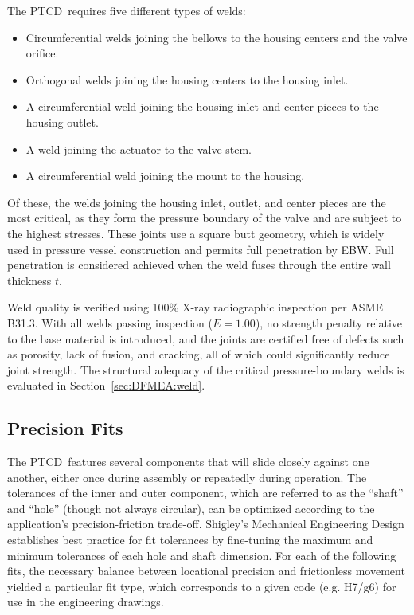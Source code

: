 \documentclass[12pt, letterpaper]{report}%
\newcounter{mycounter}           %
\newcounter{sub}[mycounter]      %
\newcommand{\device}{PTCD}
\begin{document}
		The \device\ requires five different types of welds:

		\begin{itemize}
			\item Circumferential welds joining the bellows to the housing centers and the 
				valve orifice.
			\item Orthogonal welds joining the housing centers to the housing inlet.
			\item A circumferential weld joining the housing inlet and center pieces to the 
				housing outlet.
			\item A weld joining the actuator to the valve stem.
			\item A circumferential weld joining the mount to the housing.
		\end{itemize}

		Of these, the welds joining the housing inlet, outlet, and center pieces are the most 
		critical, as they form the pressure boundary of the valve and are subject to the highest 
		stresses. These joints use a square butt geometry, which is widely used in pressure 
		vessel construction and permits full penetration by EBW. Full penetration is considered 
		achieved when the weld fuses through the entire wall thickness $t$.

		Weld quality is verified using 100\% X-ray radiographic inspection per ASME 
		B31.3\cite[Table~302.3.4]{ref_asme_b313}. With all welds passing inspection 
		($E = 1.00$), no strength penalty relative to the base material is introduced, and the 
		joints are certified free of defects such as porosity, lack of fusion, and cracking, 
		all of which could significantly reduce joint strength\cite{ref_steen2010laser}. The 
		structural adequacy of the critical pressure-boundary welds is evaluated in 
		Section~\ref{sec:DFMEA:weld}.

		\subsection{Precision Fits}
		\label{subsec:design:just:fits}

			The \device\ features several components that will slide closely against one another, either once during assembly or repeatedly during operation.
			The tolerances of the inner and outer component, which are referred to as the ``shaft'' and ``hole'' (though not always circular), can be optimized according to the application's precision-friction trade-off. 
			Shigley's Mechanical Engineering Design\cite[Tables 7-9, A-11, A-12]{ref_shigley} establishes best practice for fit tolerances by fine-tuning the maximum and minimum tolerances of each hole and shaft dimension.
			For each of the following fits, the necessary balance between locational precision and frictionless movement yielded a particular fit type, which corresponds to a given code (e.g. H7/g6) for use in the engineering drawings.
\end{document}
